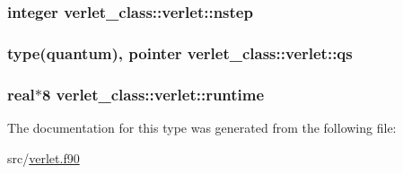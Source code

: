\hypertarget{structverlet__class_1_1verlet_a94ed501ab7103c03df9e37c9919bbc64}{
\subsubsection[{nstep}]{\setlength{\rightskip}{0pt plus 5cm}integer verlet\+\_\+class\+::verlet\+::nstep\hspace{0.3cm}{\ttfamily [private]}}}\label{structverlet__class_1_1verlet_a94ed501ab7103c03df9e37c9919bbc64}
\hypertarget{structverlet__class_1_1verlet_ab214513948e288a736b804304296c43e}{
\subsubsection[{qs}]{\setlength{\rightskip}{0pt plus 5cm}type(quantum), pointer verlet\+\_\+class\+::verlet\+::qs\hspace{0.3cm}{\ttfamily [private]}}}\label{structverlet__class_1_1verlet_ab214513948e288a736b804304296c43e}
\hypertarget{structverlet__class_1_1verlet_afe305322d2ee3c661d4ce529dae821b5}{
\subsubsection[{runtime}]{\setlength{\rightskip}{0pt plus 5cm}real$\ast$8 verlet\+\_\+class\+::verlet\+::runtime\hspace{0.3cm}{\ttfamily [private]}}}\label{structverlet__class_1_1verlet_afe305322d2ee3c661d4ce529dae821b5}


The documentation for this type was generated from the following file\+:\begin{DoxyCompactItemize}
\item 
src/\hyperlink{verlet_8f90}{verlet.\+f90}\end{DoxyCompactItemize}
